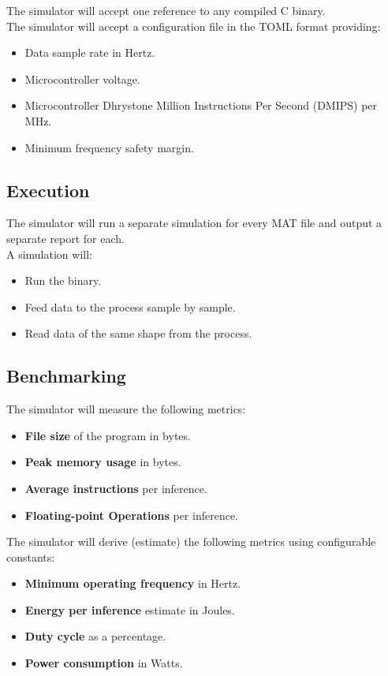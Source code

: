 \documentclass{article}
\begin{document}
\noindent The simulator will accept one reference to any compiled C binary.\\
	
\noindent The simulator will accept a configuration file in the TOML format providing:
\begin{itemize}
    \item Data sample rate in Hertz.
    \item Microcontroller voltage.
    \item Microcontroller Dhrystone Million Instructions Per Second (DMIPS) per MHz.
    \item Minimum frequency safety margin.
\end{itemize}

\subsection{Execution}

The simulator will run a separate simulation for every MAT file and output a separate report for each.\\

\noindent A simulation will:
\begin{itemize}
    \item Run the binary.
    \item Feed data to the process sample by sample.
    \item Read data of the same shape from the process.
\end{itemize}

\subsection{Benchmarking}

The simulator will measure the following metrics:
\begin{itemize}
    \item \textbf{File size} of the program in bytes.
    \item \textbf{Peak memory usage} in bytes.
    \item \textbf{Average instructions} per inference.
    \item \textbf{Floating-point Operations} per inference.\\
\end{itemize}

\noindent The simulator will derive (estimate) the following metrics using configurable constants:
\begin{itemize}
    \item \textbf{Minimum operating frequency} in Hertz.
    \item \textbf{Energy per inference} estimate in Joules.
    \item \textbf{Duty cycle} as a percentage.
    \item \textbf{Power consumption} in Watts.\\
\end{itemize}
	
\end{document}
